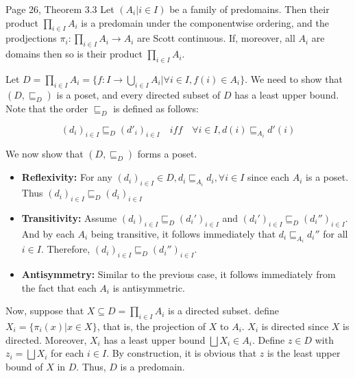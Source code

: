 \begin{problem}{Page 26, Theorem 3.3}
    Let $(A_i | i \in I)$ be a family of predomains. Then their product $\prod_{i \in I} A_i$ is a predomain
    under the componentwise ordering, and the prodjections $\pi_i : \prod_{i \in I} A_i \to A_i$ are Scott continuous. If, moreover, all $A_i$ are domains then so is their product $\prod_{i \in I} A_i$.
\end{problem}

\begin{solution}
    Let $D = \prod_{i \in I} A_i = \{ f : I \to \bigcup_{i \in I} A_i | \forall i \in I, f(i) \in A_i \}$. We need to show that $(D, \sqsubseteq_D)$ is a poset, and every directed subset of $D$ has a least upper bound. Note that the order $\sqsubseteq_D$ is defined as follows:

$$ (d_i)_{i \in I} \sqsubseteq_D (d'_i)_{i \in I} \quad iff \quad \forall i \in I, d(i) \sqsubseteq_{A_i} d'(i) $$

We now show that $(D, \sqsubseteq_D)$ forms a poset. 
\begin{itemize}
    \item \textbf{Reflexivity:} For any $(d_i)_{i \in I} \in D, d_i \sqsubseteq_{A_i} d_i, \forall i \in I$ since each $A_i$ is a poset. Thus $(d_i)_{i \in I} \sqsubseteq_D (d_i)_{i \in I}$
    \item \textbf{Transitivity:} Assume $(d_i)_{i \in I} \sqsubseteq_D (d_i')_{i \in I}$ and $(d_i')_{i \in I} \sqsubseteq_D (d_i'')_{i \in I}$. And by each $A_i$ being transitive, it follows immediately that $d_i \sqsubseteq_{A_i} d_i''$ for all $i \in I$. Therefore, $(d_i)_{i \in I} \sqsubseteq_D (d_i'')_{i \in I}$.
    \item \textbf{Antisymmetry:} Similar to the previous case, it follows immediately from the fact that each $A_i$ is antisymmetric.
\end{itemize}

Now, suppose that $X \subseteq D = \prod_{i \in I} A_i$ is a directed subset. define 
    $X_i = \{ \pi_i(x) | x \in X \} $, that is, the projection of $X$ to $A_i$. $X_i$ is directed since $X$ is directed.
    Moreover, $X_i$ has a least upper bound $ \bigsqcup X_i \in A_i $. Define $z \in D$
    with $z_i = \bigsqcup X_i$ for each $i \in I$. By construction, it is obvious that $z$ is the least upper bound of $X$ in $D$.
    Thus, $D$ is a predomain.
\end{solution}
